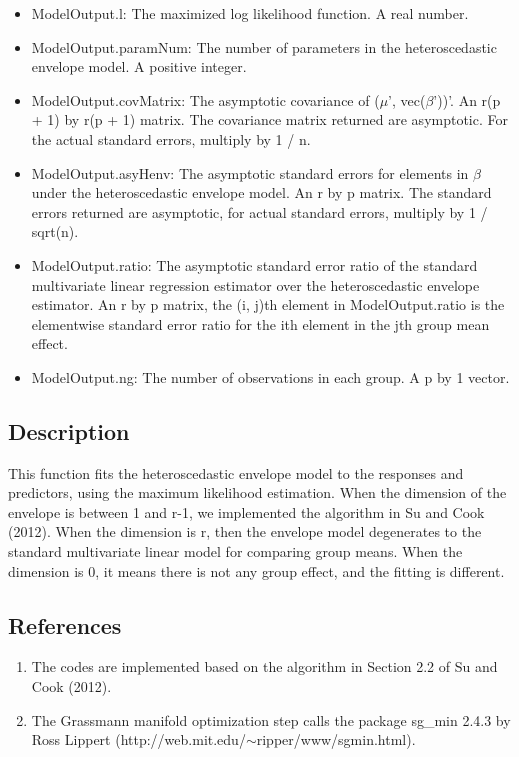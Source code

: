 \documentclass[a4paper,11pt,openany]{memoir}
\begin{document}
\begin{itemize}
   \item ModelOutput.l: The maximized log likelihood function.  A real number.
   \item ModelOutput.paramNum: The number of parameters in the heteroscedastic envelope model.  A positive integer.
   \item ModelOutput.covMatrix: The asymptotic covariance of ($\mu$', vec($\beta$'))'.  An r(p + 1) by r(p + 1) matrix.  The covariance matrix returned are asymptotic.  For the actual standard errors, multiply by 1 / n.
   \item ModelOutput.asyHenv: The asymptotic standard errors for elements in $\beta$ under the heteroscedastic envelope model. An r by p matrix.  The standard errors returned are asymptotic, for actual standard errors, multiply by 1 / sqrt(n).
   \item ModelOutput.ratio: The asymptotic standard error ratio of the standard multivariate linear regression estimator over the heteroscedastic envelope estimator. An r by p matrix, the (i, j)th element in ModelOutput.ratio is the elementwise standard error ratio for the ith element in the jth group mean effect.
   \item ModelOutput.ng: The number of observations in each group.  A p by 1 vector.
\end{itemize}


\subsection*{Description}

\begin{par}
This function fits the heteroscedastic envelope model to the responses and predictors, using the maximum likelihood estimation.  When the dimension of the envelope is between 1 and r-1, we implemented the algorithm in Su and Cook (2012). When the dimension is r, then the envelope model degenerates to the standard multivariate linear model for comparing group means.  When the dimension is 0, it means there is not any group effect, and the fitting is different.
\end{par} \vspace{1em}


\subsection*{References}

\begin{enumerate}
\setlength{\itemsep}{-1ex}
   \item The codes are implemented based on the algorithm in Section 2.2 of Su and Cook (2012).
   \item The Grassmann manifold optimization step calls the package sg\_min 2.4.3 by Ross Lippert (http://web.mit.edu/$\sim$ripper/www/sgmin.html).
\end{enumerate}
\end{document}
